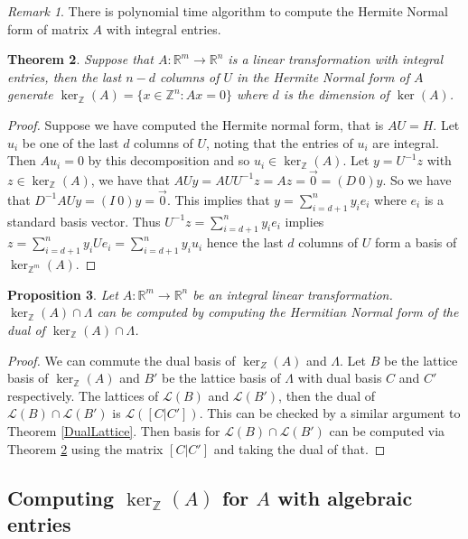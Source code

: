 \documentclass{article}
\newcommand{\Z}[0]{\mathbb{Z}}		%
\newcommand{\R}[0]{\mathbb{R}}		%
\newcommand{\La}[0]{\mathcal L}
\newtheorem{thm}{Theorem}[section]
\newtheorem{prop}[thm]{Proposition}
\theoremstyle{definition}
\theoremstyle{remark}
\newtheorem{rem}[thm]{Remark}
\begin{document}
\begin{rem}
There is polynomial time algorithm to compute the Hermite Normal form of matrix $A$ with integral entries. \cite{KoppeJesusBook} 
\end{rem}
\begin{thm}\label{LatticeBasis}
Suppose that $A:\R^m\to \R^n$ is a linear transformation with integral entries, then the last $n-d$ columns of $U$ in the Hermite Normal form of $A$ generate $\ker_\Z (A) =\{ x\in \Z^n: Ax = 0\}$ where $d$ is the dimension of $\ker(A)$.  
\end{thm}
\begin{proof}

 Suppose we have computed the Hermite normal form, that is $AU = H$. Let $u_i$ be one of the last $d$ columns of $U$, noting that the entries of $u_i$ are integral. Then $Au_i = 0$ by this decomposition and so $u_i\in \ker_{\Z}(A)$. Let $y = U^{-1}z$ with $z\in \ker_{\Z}(A)$, we have that $AUy = AUU^{-1}z = Az = \vec{0} = (D~0)y$. So we have that $D^{-1}AUy = (I~0)y =\vec{0}$. This implies that $y = \sum\limits_{i=d+1}^n y_ie_i$ where $e_i$ is a standard basis vector. Thus $U^{-1}z =\sum\limits_{i=d+1}^n y_ie_i  $ implies $z  =\sum\limits_{i=d+1}^n y_iUe_i =\sum\limits_{i=d+1}^n y_iu_i   $ hence the last $d$ columns of $U$ form a basis of $\ker_{\Z^m}(A). $ 

\end{proof}



\begin{prop}
Let $A:\R^m \to \R^n$ be an integral linear transformation. $\ker_\Z(A) \cap \Lambda$ can be computed by computing the Hermitian Normal form of the dual of $\ker_\Z(A) \cap \Lambda$.
\end{prop}
\begin{proof}
We can commute the dual basis of $\ker_Z(A)$ and $\Lambda$. Let $B$ be the lattice basis of $\ker_\Z(A)$ and $B'$ be the lattice basis of $\Lambda$ with dual basis $C$ and $C'$ respectively.   The lattices of $\La(B)$ and $\La(B')$, then the dual of $\La(B)\cap \La(B')$ is $\La([C|C'])$. This can be checked by a similar argument to Theorem \ref{DualLattice}. Then basis for $\La(B)\cap \La(B')$ can be computed via Theorem \ref{LatticeBasis} using the matrix $[C|C']$ and taking the dual of that. 
\end{proof}



\subsection{Computing $\ker_\Z(A)$ for $A$ with algebraic entries}
\end{document}
